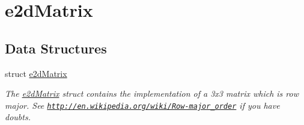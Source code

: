 \hypertarget{group__e2dMatrix}{\section{e2d\-Matrix}
\label{group__e2dMatrix}
}
\subsection*{Data Structures}
\begin{DoxyCompactItemize}
\item 
struct \hyperlink{structe2dMatrix}{e2d\-Matrix}
\begin{DoxyCompactList}\small\item\em The \hyperlink{structe2dMatrix}{e2d\-Matrix} struct contains the implementation of a 3x3 matrix which is row major. See \href{http://en.wikipedia.org/wiki/Row-major_order}{\tt http\-://en.\-wikipedia.\-org/wiki/\-Row-\/major\-\_\-order} if you have doubts. \end{DoxyCompactList}\end{DoxyCompactItemize}
